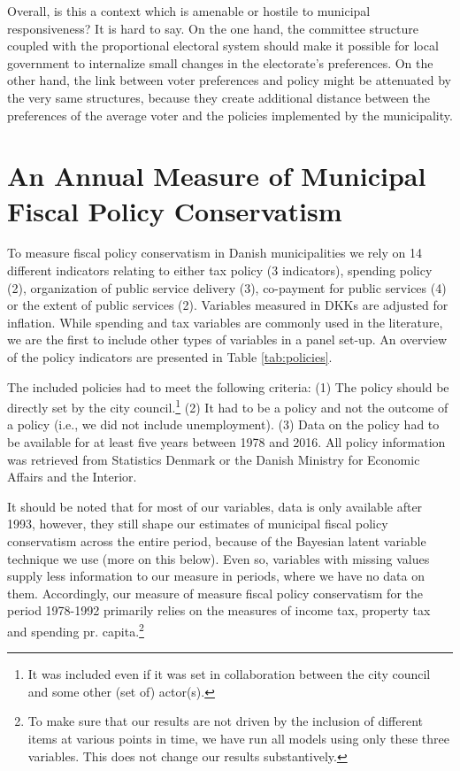 \documentclass[a4paper,12pt]{article}
\begin{document}
Overall, is this a context which is amenable or hostile to municipal responsiveness? It is hard to say. On the one hand, the committee structure coupled with the proportional electoral system should make it possible for local government to internalize small changes in the electorate's preferences. On the other hand, the link between voter preferences and policy might be attenuated by the very same structures, because they create additional distance between the preferences of the average voter and the policies implemented by the municipality.

\section{An Annual Measure of Municipal Fiscal Policy Conservatism}
To measure fiscal policy conservatism in Danish municipalities we rely on 14 different indicators relating to either tax policy (3 indicators), spending policy (2), organization of public service delivery (3), co-payment for public services (4) or the extent of public services (2). Variables measured in DKKs are adjusted for inflation. While  spending and tax variables are commonly used in the literature, we are the first to include other types of variables in a panel set-up. An overview of the policy indicators are presented in Table \ref{tab:policies}.

The included policies had to meet the following criteria: (1) The policy should be directly set by the city council.\footnote{It was included even if it was set in collaboration between the city council and some other (set of) actor(s).} (2) It had to be a policy and not the outcome of a policy (i.e., we did not include unemployment). (3) Data on the policy had to be available for at least five years between 1978 and 2016. All policy information was retrieved from Statistics Denmark or the Danish Ministry for Economic Affairs and the Interior.

It should be noted that for most of our variables, data is only available after 1993, however, they still shape our estimates of municipal fiscal policy conservatism across the entire period, because of the Bayesian latent variable technique we use (more on this below). Even so, variables with missing values supply less information to our measure in periods, where we have no data on them. Accordingly, our measure of measure fiscal policy conservatism for the period 1978-1992 primarily relies on the measures of income tax, property tax and spending pr. capita.\footnote{To make sure that our results are not driven by the inclusion of different items at various points in time, we have run all models using only these three variables. This does not change our results substantively.}
\end{document}
